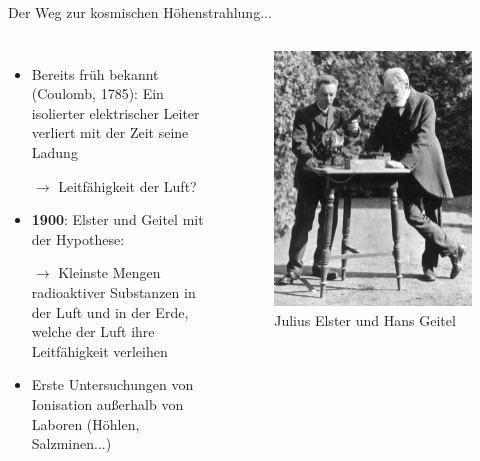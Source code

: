 \documentclass[aspectratio=1610, professionalfonts, 9pt, hyperref={colorlinks=false}]{beamer}
\begin{document}
\begin{frame}{Der Weg zur kosmischen Höhenstrahlung...}
  \begin{columns}
      \begin{itemize}
        \setlength\itemsep{0.5em}
        \item Bereits früh bekannt (Coulomb, 1785): Ein isolierter elektrischer Leiter verliert mit der Zeit seine Ladung
        \item [$\rightarrow$] Leitfähigkeit der Luft?
        \item \textbf{1900}: Elster und Geitel mit der Hypothese:
        \item [$\rightarrow$] Kleinste Mengen radioaktiver Substanzen in der Luft und in der Erde, welche der Luft ihre Leitfähigkeit verleihen
        \item Erste Untersuchungen von Ionisation außerhalb von Laboren (Höhlen, Salzminen...)
      \end{itemize}
        \vspace*{10px}
  
      \begin{figure}
          \centering
          \includegraphics[width=0.7\linewidth]{images/Julius-Elster-and-Hans-Geitel-experimenting-in-the-garden-of-Elsters-house-The.png}
          \caption{Julius Elster und Hans Geitel \cite{article}}
      \end{figure}
  \end{columns}
\end{frame}
\end{document}
